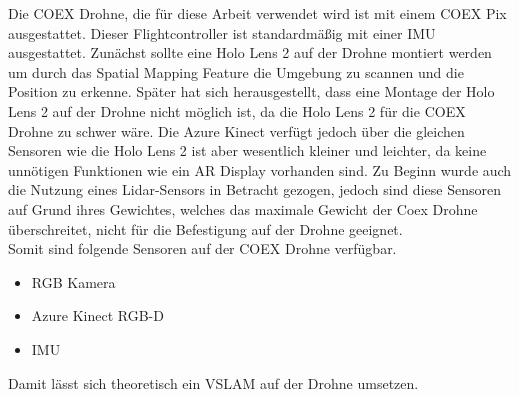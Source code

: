 Die COEX Drohne, die für diese Arbeit verwendet wird ist mit einem COEX Pix ausgestattet.
Dieser Flightcontroller ist standardmäßig mit einer \ac{IMU} ausgestattet. Zunächst sollte eine Holo Lens 2 auf der Drohne montiert werden um durch das Spatial Mapping Feature die Umgebung zu scannen und die Position zu erkenne.
Später hat sich herausgestellt, dass eine Montage der Holo Lens 2 auf der Drohne nicht möglich ist, da die Holo Lens 2 für die COEX Drohne zu schwer wäre.
Die Azure Kinect verfügt jedoch über die gleichen Sensoren wie die Holo Lens 2 ist aber wesentlich kleiner und leichter, da keine unnötigen Funktionen wie ein \ac{AR} Display vorhanden sind.
Zu Beginn wurde auch die Nutzung eines \ac{Lidar}-Sensors in Betracht gezogen, jedoch sind diese Sensoren auf Grund ihres Gewichtes, welches das maximale Gewicht der Coex Drohne überschreitet, nicht für die Befestigung auf der Drohne geeignet.\\
Somit sind folgende Sensoren auf der COEX Drohne verfügbar.

\begin{itemize}
    \item{RGB Kamera}
    \item{Azure Kinect \ac{RGB-D}}
    \item{\ac{IMU}}
\end{itemize}

Damit lässt sich theoretisch ein \ac{VSLAM} auf der Drohne umsetzen.



